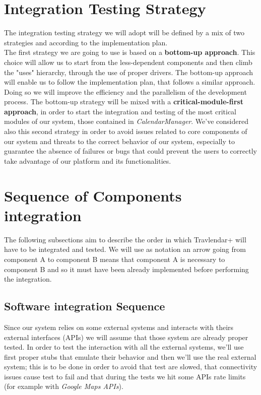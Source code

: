 \section{Integration Testing Strategy}
The integration testing strategy we will adopt will be defined by a mix of two strategies and according to the  implementation plan. \\
The first strategy we are going to use is based on a \textbf{bottom-up approach}. This choice will allow us to start from the less-dependent components and then climb the "uses" hierarchy, through the use of proper drivers. The bottom-up approach will enable us to follow the implementation plan, that follows a similar approach. Doing so we will improve the efficiency and the parallelism of the development process. \newline
The bottom-up strategy will be mixed with a \textbf{critical-module-first approach}, in order to start the integration and testing of the most critical modules of our system, those contained in \textit{CalendarManager}. We've considered also this second strategy in order to avoid issues related to core components of our system and threats to the correct behavior of our system, especially to guarantee the absence of failures or bugs that could prevent the users to correctly take advantage of our platform and its functionalities.

\section{Sequence of Components integration}
The following subsections aim to describe the order in which Travlendar+ will have to be integrated and tested. We will use as notation an arrow going from component A to component B means that component A is necessary to component B and so it must have been already implemented before performing the integration.

\subsection{Software integration Sequence}
Since our system relies on some external systems and interacts with theirs external interfaces (APIs) we will assume that those system are already proper tested. In order to test the interaction with all the external systems, we'll use first proper stubs that emulate their behavior and then we'll use the real external system; this is to be done in order to avoid that test are slowed, that connectivity issues cause test to fail and that during the tests we hit some APIs rate limits (for example with \textit{Google Maps APIs}).

